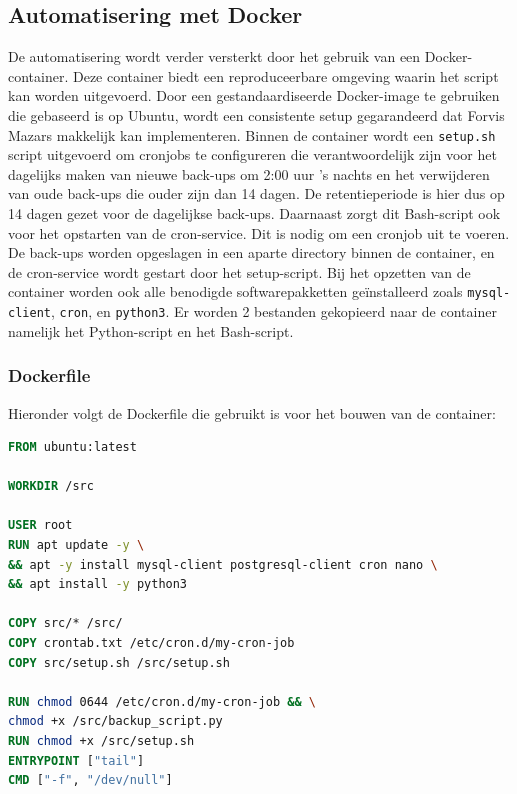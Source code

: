 \subsection{Automatisering met Docker}
De automatisering wordt verder versterkt door het gebruik van een Docker-container. Deze container biedt een reproduceerbare omgeving waarin het script kan worden uitgevoerd. Door een gestandaardiseerde Docker-image te gebruiken die gebaseerd is op Ubuntu, wordt een consistente setup gegarandeerd dat Forvis Mazars makkelijk kan implementeren. Binnen de container wordt een \texttt{setup.sh} script uitgevoerd om cronjobs te configureren die verantwoordelijk zijn voor het dagelijks maken van nieuwe back-ups om 2:00 uur 's nachts en het verwijderen van oude back-ups die ouder zijn dan 14 dagen. De retentieperiode is hier dus op 14 dagen gezet voor de dagelijkse back-ups. Daarnaast zorgt dit Bash-script ook voor het opstarten van de cron-service. Dit is nodig om een cronjob uit te voeren. De back-ups worden opgeslagen in een aparte directory binnen de container, en de cron-service wordt gestart door het setup-script. Bij het opzetten van de container  worden ook alle benodigde softwarepakketten geïnstalleerd zoals \texttt{mysql-client}, \texttt{cron}, en \texttt{python3}. Er worden 2 bestanden gekopieerd naar de container namelijk het Python-script en het Bash-script.

\subsubsection{Dockerfile}
Hieronder volgt de Dockerfile die gebruikt is voor het bouwen van de container:
\begin{lstlisting}[language=Dockerfile, caption=Dockerfile voor de back-upcontainer]
FROM ubuntu:latest

WORKDIR /src

USER root
RUN apt update -y \
&& apt -y install mysql-client postgresql-client cron nano \
&& apt install -y python3

COPY src/* /src/
COPY crontab.txt /etc/cron.d/my-cron-job
COPY src/setup.sh /src/setup.sh

RUN chmod 0644 /etc/cron.d/my-cron-job && \
chmod +x /src/backup_script.py 
RUN chmod +x /src/setup.sh
ENTRYPOINT ["tail"]
CMD ["-f", "/dev/null"]
\end{lstlisting}

